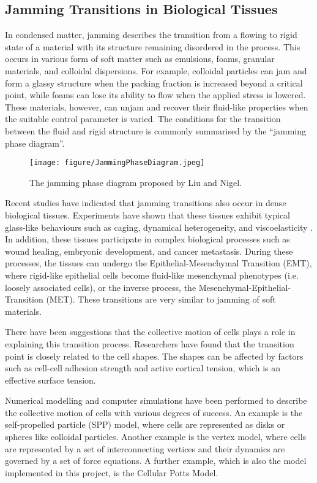 \documentclass[a4paper,12pt]{article}
\begin{document}
\subsection{Jamming Transitions in Biological Tissues}
In condensed matter, jamming describes the transition from a flowing to rigid state of a material with its structure remaining disordered in the process. This occurs in various form of soft matter such as emulsions, foams, granular materials, and colloidal dispersions\cite{hecke2010}. For example, colloidal particles can jam and form a glassy structure when the packing fraction is increased beyond a critical point, while foams can lose its ability to flow when the applied stress is lowered. These materials, however, can unjam and recover their fluid-like properties when the suitable control parameter is varied. The conditions for the transition between the fluid and rigid structure is commonly summarised by the ``jamming phase diagram''\cite{liu2010}.

\begin{figure}[h]
\centering
\texttt{[image: figure/JammingPhaseDiagram.jpeg]}
\caption{The jamming phase diagram proposed by Liu and Nigel.}
\label{fig:JammingPhaseDiagram}
\end{figure}

Recent studies have indicated that jamming transitions also occur in dense biological tissues. Experiments have shown that these tissues exhibit typical glass-like behaviours such as caging, dynamical heterogeneity, and viscoelasticity \cite{schoetz2013,angelini2011}. In addition, these tissues participate in complex biological processes such as wound healing, embryonic development, and cancer metastasis. During these processes, the tissues can undergo the Epithelial-Mesenchymal Transition (EMT), where rigid-like epithelial cells become fluid-like mesenchymal phenotypes (i.e. loosely associated cells), or the inverse process, the Mesenchymal-Epithelial-Transition (MET). These transitions are very similar to jamming of soft materials. 

There have been suggestions that the collective motion of cells plays a role in explaining this transition process. Researchers have found that the transition point is closely related to the cell shapes\cite{bi-density2015}. The shapes can be affected by factors such as cell-cell adhesion strength and active cortical tension, which is an effective surface tension.

Numerical modelling and computer simulations have been performed to describe the collective motion of cells with various degrees of success. An example is the self-propelled particle (SPP) model, where cells are represented as disks or spheres like colloidal particles. Another example is the vertex model, where cells are represented by a set of interconnecting vertices and their dynamics are governed by a set of force equations. A further example, which is also the model implemented in this project, is the Cellular Potts Model.
\end{document}
